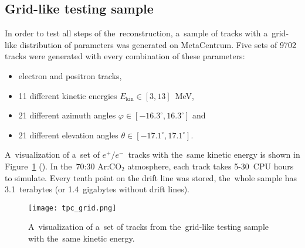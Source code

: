 		\subsection{Grid-like testing sample}
		\label{sec:microgrid}
			In order to test all steps of the~reconstruction, a~sample of tracks with a~grid-like distribution of parameters was generated on MetaCentrum. Five sets of 9702 tracks were generated with every combination of these parameters:
				\begin{itemize}[nosep]
					\item electron and positron tracks,
					\item 11 different kinetic energies $E_\text{kin}\in[3,13]$~MeV,
					\item 21 different azimuth angles $\varphi \in [-16.3^\circ,16.3^\circ]$ and
					\item 21 different elevation angles $\theta \in [-17.1^\circ,17.1^\circ]$.
				\end{itemize}
			A~visualization of a~set of $e^+/e^-$~tracks with the~same kinetic energy is shown in Figure~\ref{fig:microgrid} (). In the~70:30 Ar:CO$_2$ atmosphere, each track takes 5-30~CPU hours to simulate. Every tenth point on the drift line was stored, the~whole sample has 3.1~terabytes (or 1.4~gigabytes without drift lines).
			
				\begin{figure}
					\centering
					\texttt{[image: tpc\_grid.png]}
					\caption{A~visualization of a~set of tracks from the~grid-like testing sample with the~same kinetic energy.}
					\label{fig:microgrid}
				\end{figure}
	
